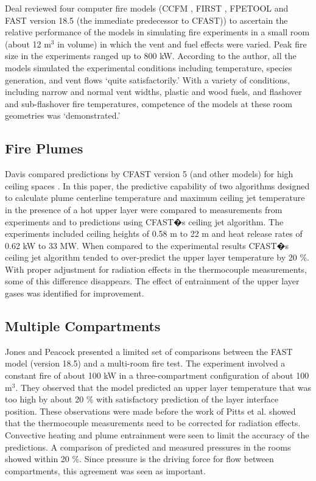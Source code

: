 Deal \cite{Valid:Deal} reviewed four computer fire models (CCFM \cite{Models:CCFM}, FIRST \cite{Models:FIRST}, FPETOOL \cite{Models:FPETool} and FAST \cite{Models:FAST} version 18.5 (the immediate predecessor to CFAST)) to ascertain the relative performance of the models in simulating fire experiments in a small room (about 12 m$^3$ in volume) in which the vent and fuel effects were varied. Peak fire size in the experiments ranged up to 800 kW. According to the author, all the models simulated the experimental conditions including temperature, species generation, and vent flows `quite satisfactorily.' With a variety of conditions, including narrow and normal vent widths, plastic and wood fuels, and flashover and sub-flashover fire temperatures, competence of the models at these room geometries was `demonstrated.'

\subsection{Fire Plumes}

Davis compared predictions by CFAST version 5 (and other models) for high ceiling spaces \cite{Valid:Davis_Plumes}. In this paper, the predictive capability of two algorithms designed to calculate plume centerline temperature and maximum ceiling jet temperature in the presence of a hot upper layer were compared to measurements from experiments and to predictions using CFAST�s ceiling jet algorithm. The experiments included ceiling heights of 0.58 m to 22 m and heat release rates of 0.62 kW to 33 MW. When compared to the experimental results CFAST�s ceiling jet algorithm tended to over-predict the upper layer temperature by 20 \%. With proper adjustment for radiation effects in the thermocouple measurements, some of this difference disappears. The effect of entrainment of the upper layer gases was identified for improvement.

\subsection{Multiple Compartments}
\label{secMultipleCompartments}

Jones and Peacock \cite{Valid:Jones} presented a limited set of comparisons between the FAST model (version 18.5) and a multi-room fire test. The experiment involved a constant fire of about 100 kW in a three-compartment configuration of about 100 m$^3$. They observed that the model predicted an upper layer temperature that was too high by about 20 \% with satisfactory prediction of the layer interface position. These observations were made before the work of Pitts et al. \cite{Valid:Pitts} showed that the thermocouple measurements need to be corrected for radiation effects. Convective heating and plume entrainment were seen to limit the accuracy of the predictions. A comparison of predicted and measured pressures in the rooms showed within 20 \%. Since pressure is the driving force for flow between compartments, this agreement was seen as important.

